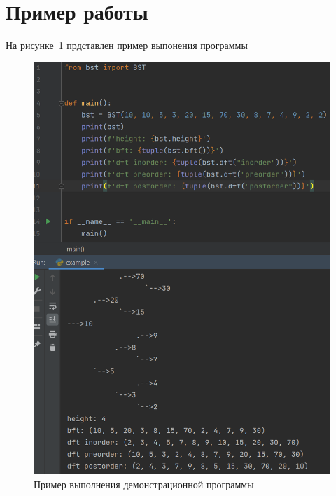 \section*{Пример работы}

На рисунке~\ref{fig:example} прдставлен пример выпонения программы

\begin{figure}[H]
    \centering
    \includegraphics[width=0.75\linewidth]{photo/example}
    \caption{Пример выполнения демонстрационной программы}
    \label{fig:example}
\end{figure}